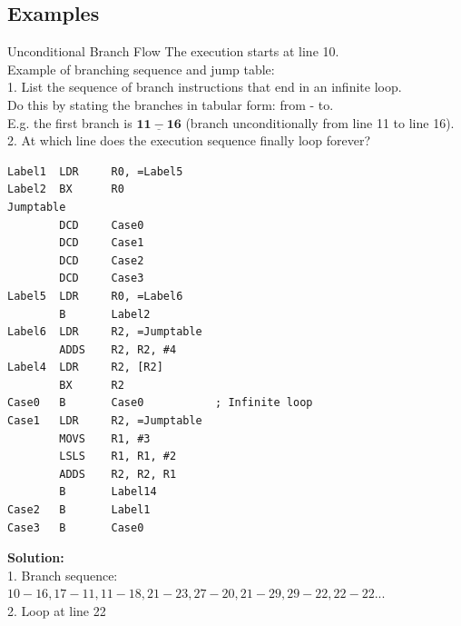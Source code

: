 \subsection{Examples}



\begin{example2}{Unconditional Branch Flow} The execution starts at line 10.\\
Example of branching sequence and jump table:
\vspace{2mm}\\
1. List the sequence of branch instructions that end in an infinite loop.\\
Do this by stating the branches in tabular form: from - to.\\
E.g. the first branch is $\underline{\mathbf{1 1 - 1 6}}$ (branch unconditionally from line 11 to line 16).
\vspace{2mm}\\
2. At which line does the execution sequence finally loop forever?
\begin{lstlisting}[language=armasm, style=basesmol]
Label1  LDR     R0, =Label5
Label2  BX      R0
Jumptable
        DCD     Case0
        DCD     Case1
        DCD     Case2
        DCD     Case3
Label5  LDR     R0, =Label6
        B       Label2
Label6  LDR     R2, =Jumptable
        ADDS    R2, R2, #4
Label4  LDR     R2, [R2]
        BX      R2
Case0   B       Case0           ; Infinite loop
Case1   LDR     R2, =Jumptable
        MOVS    R1, #3
        LSLS    R1, R1, #2
        ADDS    R2, R2, R1
        B       Label14
Case2   B       Label1
Case3   B       Case0
\end{lstlisting}

\textbf{Solution:}\\
1. Branch sequence:\\ $10-16, 17-11, 11-18, 21-23, 27-20, 21-29, 29-22, 22-22...$\\
2. Loop at line 22
\end{example2}



